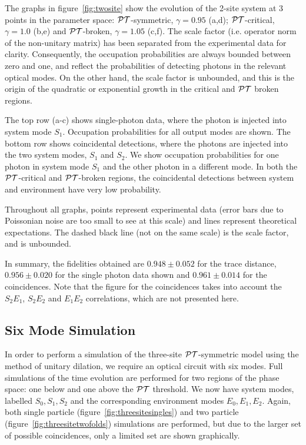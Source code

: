 The graphs in figure~\ref{fig:twosite} show the evolution of the 2-site system
at 3 points in the parameter space: \(\mathcal{PT}{}\)-symmetric, \(\gamma=0.95\) (a,d);
\(\mathcal{PT}{}\)-critical, \(\gamma=1.0\) (b,e) and \(\mathcal{PT}{}\)-broken, \(\gamma=1.05\)
(c,f). The scale factor (i.e. operator norm of the non-unitary matrix) has been
separated from the experimental data for clarity. Consequently, the occupation
probabilities are always bounded between zero and one, and reflect the
probabilities of detecting photons in the relevant optical modes. On the other
hand, the scale factor is unbounded, and this is the origin of the quadratic or
exponential growth in the critical and \(\mathcal{PT}{}\) broken regions.

The top row (a-c) shows single-photon data, where the photon is injected into
system mode \(S_1\). Occupation probabilities for all output modes are shown.
The bottom row shows coincidental detections, where the photons are injected
into the two system modes, \(S_1\) and \(S_2\). We show occupation probabilities
for one photon in system mode \(S_1\) and the other photon in a different mode.
In both the \(\mathcal{PT}{}\)-critical and \(\mathcal{PT}{}\)-broken regions, the coincidental
detections between system and environment have very low probability.

Throughout all graphs, points represent experimental data (error bars due to
Poissonian noise are too small to see at this scale) and lines represent
theoretical expectations. The dashed black line (not on the same scale) is the
scale factor, and is unbounded.

In summary, the fidelities obtained are \(0.948 \pm 0.052\) for the trace
distance, \(0.956 \pm 0.020\) for the single photon data shown and \(0.961 \pm
0.014\) for the coincidences. Note that the figure for the coincidences takes
into account the \(S_2 E_1\), \(S_2 E_2\) and \(E_1 E_2\) correlations, which
are not presented here.

\subsection{Six Mode Simulation}
\label{sec:SixMode}
In order to perform a simulation of the three-site \(\mathcal{PT}\)-symmetric model using
the method of unitary dilation, we require an optical circuit with six modes.
Full simulations of the time evolution are performed for two regions of the
phase space: one below and one above the \(\mathcal{PT}\) threshold. We now have
system modes, labelled \(S_{0}, S_{1}, S_{2}\) and the corresponding environment
modes \(E_{0}, E_{1}, E_{2}\). Again, both single particle
(figure~\ref{fig:threesitesingles}) and two particle
(figure~\ref{fig:threesitetwofolds}) simulations are performed, but due to the
larger set of possible coincidences, only a limited set are shown graphically.

